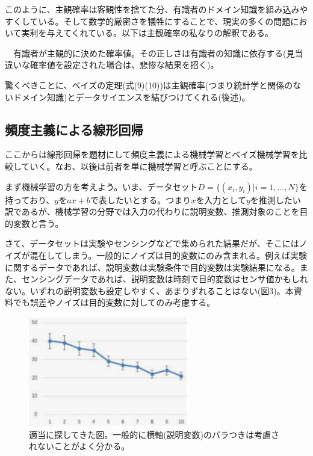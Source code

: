 \documentclass[dvipdfmx, 9pt, a4paper]{jsarticle}
\begin{document}
このように、主観確率は客観性を捨てた分、有識者のドメイン知識を組み込みやすくしている。そして数学的厳密さを犠牲にすることで、現実の多くの問題において実利を与えてくれている。以下は主観確率の私なりの解釈である。
\begin{tcolorbox}[title=主観確率]
　有識者が主観的に決めた確率値。その正しさは有識者の知識に依存する(見当違いな確率値を設定された場合は、悲惨な結果を招く)。
\end{tcolorbox}
驚くべきことに、ベイズの定理(式(9)(10))は主観確率(つまり統計学と関係のないドメイン知識)とデータサイエンスを結びつけてくれる(後述)。

\subsection{頻度主義による線形回帰}
ここからは線形回帰を題材にして頻度主義による機械学習とベイズ機械学習を比較していく。なお、以後は前者を単に機械学習と呼ぶことにする。\par
まず機械学習の方を考えよう。いま、データセット$D=\{ (x_i, y_i)|i=1,...,N \}$を持っており、$y$を$ax+b$で表したいとする。つまり$x$を入力として$y$を推測したい訳であるが、機械学習の分野では入力の代わりに説明変数、推測対象のことを目的変数と言う。\par
さて、データセットは実験やセンシングなどで集められた結果だが、そこにはノイズが混在してしまう。一般的にノイズは目的変数にのみ含まれる。例えば実験に関するデータであれば、説明変数は実験条件で目的変数は実験結果になる。また、センシングデータであれば、説明変数は時刻で目的変数はセンサ値かもしれない。いずれの説明変数も設定しやすく、あまりずれることはない(図3)。本資料でも誤差やノイズは目的変数に対してのみ考慮する。

\begin{figure}[t]
\begin{center}
\includegraphics[width=7cm]{"fig3.png"}
\caption{適当に探してきた図。一般的に横軸(説明変数)のバラつきは考慮されないことがよく分かる。}
\end{center}
\end{figure}
\end{document}
